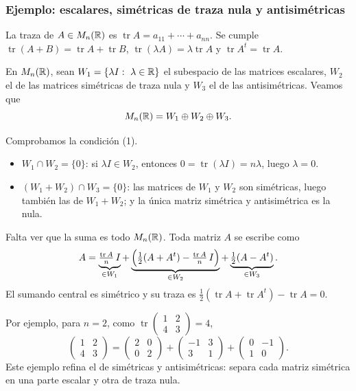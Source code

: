 \begin{frame}[allowframebreaks, t]
    \frametitle{Ejemplo: escalares, simétricas de traza nula y antisimétricas}

    La \alert{traza} de $A\in M_n(\mathbb{R})$ es $\operatorname{tr}A=a_{11}+\cdots+a_{nn}$.
    Se cumple $\operatorname{tr}(A+B)=\operatorname{tr}A+\operatorname{tr}B$,
    $\operatorname{tr}(\lambda A)=\lambda\operatorname{tr}A$ y
    $\operatorname{tr}A^t=\operatorname{tr}A$.

    \begin{example}
        En $M_n(\mathbb{R})$, sean $W_1=\{\lambda I:\ \lambda\in\mathbb{R}\}$ el subespacio de
        las matrices \alert{escalares}, $W_2$ el de las matrices
        \alert{simétricas de traza nula} y $W_3$ el de las
        \alert{antisimétricas}. Veamos que
        \[
            M_n(\mathbb{R})=W_1\oplus W_2\oplus W_3.
        \]
    \end{example}

    Comprobamos la condición (1).
    \begin{itemize}
        \item $W_1\cap W_2=\{0\}$: si $\lambda I\in W_2$, entonces
        $0=\operatorname{tr}(\lambda I)=n\lambda$, luego $\lambda=0$.
        \item $(W_1+W_2)\cap W_3=\{0\}$: las matrices de $W_1$ y $W_2$ son
        simétricas, luego también las de $W_1+W_2$; y la única matriz
        simétrica y antisimétrica es la nula.
    \end{itemize}

    \framebreak

    Falta ver que la suma es todo $M_n(\mathbb{R})$. Toda matriz $A$ se escribe como
    \[
        A=\underbrace{\tfrac{\operatorname{tr}A}{n}\,I}_{\in W_1}
        +\underbrace{\Bigl(\tfrac12(A+A^t)-\tfrac{\operatorname{tr}A}{n}\,I\Bigr)}_{\in W_2}
        +\underbrace{\tfrac12(A-A^t)}_{\in W_3}.
    \]
    El sumando central es simétrico y su traza es
    $\tfrac12(\operatorname{tr}A+\operatorname{tr}A^t)-\operatorname{tr}A=0$.

    \medskip

    Por ejemplo, para $n=2$, como $\operatorname{tr}\begin{pmatrix}1&2\\4&3\end{pmatrix}=4$,
    \[
        \begin{pmatrix}1&2\\4&3\end{pmatrix}
        =\begin{pmatrix}2&0\\0&2\end{pmatrix}
        +\begin{pmatrix}-1&3\\3&1\end{pmatrix}
        +\begin{pmatrix}0&-1\\1&0\end{pmatrix}.
    \]
    Este ejemplo refina el de simétricas y antisimétricas: separa cada
    matriz simétrica en una parte escalar y otra de traza nula.
\end{frame}


